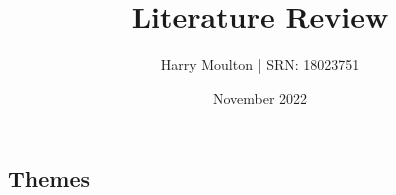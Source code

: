 \documentclass{article}
\title{Literature Review}
\author{Harry Moulton | SRN: 18023751}
\date{November 2022}
\begin{document}
\maketitle
\begin{multicols}{2}



\section{Themes}





\end{multicols}




\pagebreak
\printbibliography
\end{document}
